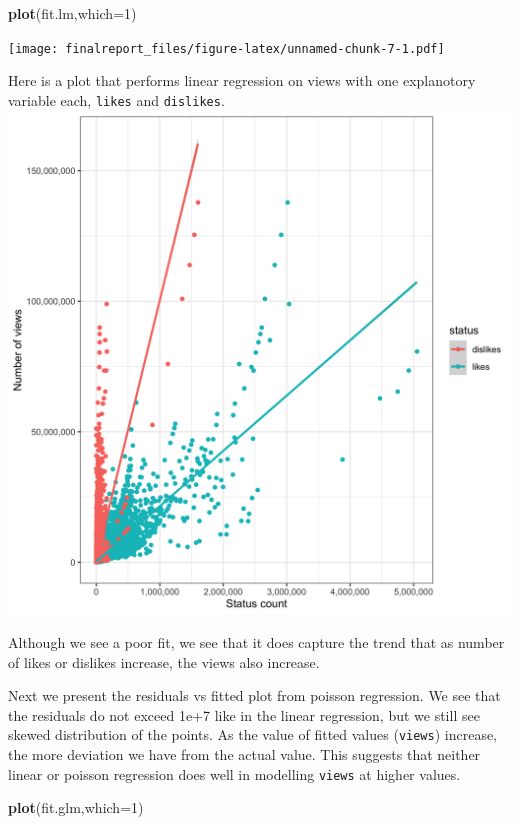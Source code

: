 \documentclass[]{article}
\newenvironment{Shaded}{\begin{snugshade}}{\end{snugshade}}
\newcommand{\DataTypeTok}[1]{\textcolor[rgb]{0.13,0.29,0.53}{#1}}
\newcommand{\DecValTok}[1]{\textcolor[rgb]{0.00,0.00,0.81}{#1}}
\newcommand{\KeywordTok}[1]{\textcolor[rgb]{0.13,0.29,0.53}{\textbf{#1}}}
\newcommand{\NormalTok}[1]{#1}
\begin{document}
\begin{Shaded}
\begin{Highlighting}[]
\KeywordTok{plot}\NormalTok{(fit.lm,}\DataTypeTok{which=}\DecValTok{1}\NormalTok{)}
\end{Highlighting}
\end{Shaded}

\texttt{[image: finalreport\_files/figure-latex/unnamed-chunk-7-1.pdf]}

Here is a plot that performs linear regression on views with one
explanotory variable each, \texttt{likes} and \texttt{dislikes}.
\includegraphics{../images/lm_status_views.png}

Although we see a poor fit, we see that it does capture the trend that
as number of likes or dislikes increase, the views also increase.

Next we present the residuals vs fitted plot from poisson regression. We
see that the residuals do not exceed 1e+7 like in the linear regression,
but we still see skewed distribution of the points. As the value of
fitted values (\texttt{views}) increase, the more deviation we have from
the actual value. This suggests that neither linear or poisson
regression does well in modelling \texttt{views} at higher values.

\begin{Shaded}
\begin{Highlighting}[]
\KeywordTok{plot}\NormalTok{(fit.glm,}\DataTypeTok{which=}\DecValTok{1}\NormalTok{)}
\end{Highlighting}
\end{Shaded}
\end{document}
